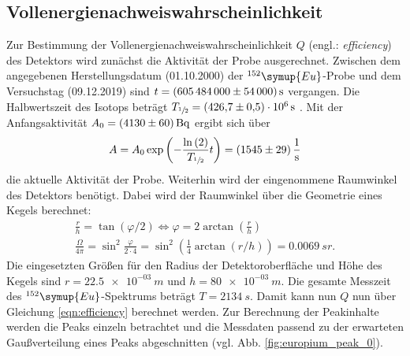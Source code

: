 \subsection{Vollenergienachweiswahrscheinlichkeit}
\label{kap:vw}
Zur Bestimmung der Vollenergienachweiswahrscheinlichkeit $Q$ (engl.: \textit{efficiency}) des Detektors wird zunächst die Aktivität der Probe ausgerechnet.
Zwischen dem angegebenen Herstellungsdatum (01.10.2000) \cite{anleitung} der $^{152}\symup{Eu}$-Probe und dem Versuchstag (09.12.2019) sind $t = \SI{605484000 (54000)}{s}$ vergangen.
Die Halbwertszeit des Isotops beträgt $T_{\sfrac{1}{2}} = \SI{426.7 (5) e+06}{s}$ \cite{nucleide}.
Mit der Anfangsaktivität $A_{0} = \SI{4130 (60)}{Bq}$ ergibt sich über
\begin{equation*}
	A = A_{0} \exp{\left( - \frac{\ln{(2)}}{T_{\sfrac{1}{2}}} t \right)} = \SI{1545(29)}{\per \second}
\end{equation*}
die aktuelle Aktivität der Probe.
Weiterhin wird der eingenommene Raumwinkel des Detektors benötigt.
Dabei wird der Raumwinkel über die Geometrie eines Kegels berechnet:
\begin{align*}
	\frac{r}{h} = \tan{( \varphi / 2 )} \Leftrightarrow \varphi = 2 \arctan{(\frac{r}{h})} \\
	\frac{\Omega}{4 \pi} = \sin^2{\frac{\varphi}{2 \cdot 4}} =  \sin^2{ \left( \frac{1}{4} \arctan{(r/h)} \right)} = \SI{0.0069}{sr}.
	\label{result:raumwinkel}
\end{align*}
Die eingesetzten Größen für den Radius der Detektoroberfläche und Höhe des Kegels sind $r = \SI{22.5e-03}{m}$ und $h = \SI{80e-03}{m}$.
Die gesamte Messzeit des $^{152}\symup{Eu}$-Spektrums beträgt $T=\SI{2134}{s}$.
Damit kann nun $Q$ nun über Gleichung \eqref{eqn:efficiency} berechnet werden.
Zur Berechnung der Peakinhalte werden die Peaks einzeln betrachtet und die Messdaten passend zu der erwarteten Gaußverteilung eines Peaks abgeschnitten (vgl. Abb. \ref{fig:europium_peak_0}).
